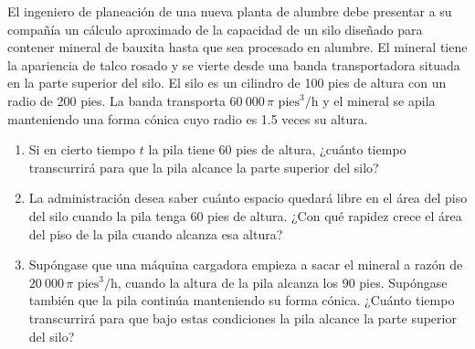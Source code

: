 \item El ingeniero de planeación de una nueva planta de alumbre debe presentar a su compañía un cálculo aproximado de la capacidad de un silo diseñado para contener mineral de bauxita hasta que sea procesado en alumbre. El mineral tiene la apariencia de talco rosado y se vierte desde una banda transportadora situada en la parte superior del silo. El silo es un cilindro de 100 pies de altura con un radio de 200 pies. La banda transporta $60\ 000 \, \pi \text{ pies}^3/\text{h}$ y el mineral se apila manteniendo una forma cónica cuyo radio es 1.5 veces su altura.
\begin{enumerate}
    \item[(a)] Si en cierto tiempo $t$ la pila tiene 60 pies de altura, ¿cuánto tiempo transcurrirá para que la pila alcance la parte superior del silo?
    \item[(b)] La administración desea saber cuánto espacio quedará libre en el área del piso del silo cuando la pila tenga 60 pies de altura. ¿Con qué rapidez crece el área del piso de la pila cuando alcanza esa altura?
    \item[(c)] Supóngase que una máquina cargadora empieza a sacar el mineral a razón de $20\ 000 \, \pi \text{ pies}^3/\text{h}$, cuando la altura de la pila alcanza los 90 pies. Supóngase también que la pila continúa manteniendo su forma cónica. ¿Cuánto tiempo transcurrirá para que bajo estas condiciones la pila alcance la parte superior del silo?
\end{enumerate}
